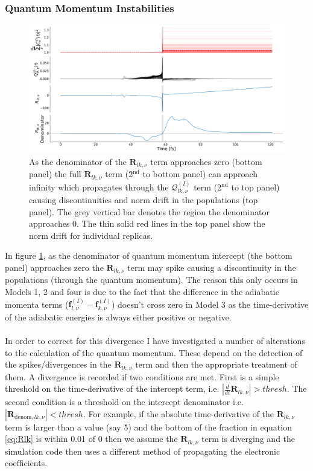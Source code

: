 \subsubsection{Quantum Momentum Instabilities}
\label{sect:QlkSpikes}
\begin{figure}[ht]
	\includegraphics[width=\textwidth]{../img/CTMQC/TullyModels/Spikes/RlkDenom_Rlk_Qlk_Norm.png}
	\caption{\label{fig:QlkSpike}As the denominator of the $\mathbf{R}_{lk,\nu}$ term approaches zero (bottom panel) the full $\mathbf{R}_{lk, \nu}$ term (2$^{\text{nd}}$ to bottom panel) can approach infinity which propagates through the $\mathcal{Q}_{lk, \nu}^{(I)}$ term (2$^{\text{nd}}$ to top panel) causing discontinuities and norm drift in the populations (top panel). The grey vertical bar denotes the region the denominator approaches 0. The thin solid red lines in the top panel show the norm drift for individual replicas.}
\end{figure}
\noindent In figure \ref{fig:QlkSpike}, as the denominator of quantum momentum intercept (the bottom panel) approaches zero the $\mathbf{R}_{lk, \nu}$ term may spike causing a discontinuity in the populations (through the quantum momentum). The reason this only occurs in Models 1, 2 and four is due to the fact that the difference in the adiabatic momenta terms ($\mathbf{f}_{l, \nu}^{(I)} - \mathbf{f}_{k, \nu}^{(I)}$) doesn't cross zero in Model 3 as the time-derivative of the adiabatic energies is always either positive or negative.
\\\\
In order to correct for this divergence I have investigated a number of alterations to the calculation of the quantum momentum. These depend on the detection of the spikes/divergences in the $\mathbf{R}_{lk, \nu}$ term and then the appropriate treatment of them. A divergence is recorded if two conditions are met. First is a simple threshold on the time-derivative of the intercept term, i.e. $|\frac{d}{dt} \mathbf{R}_{lk, \nu}| > thresh$. The second condition is a threshold on the intercept denominator i.e. $|\mathbf{R}_{\text{denom}, lk, \nu}| < thresh$. For example, if the absolute time-derivative of the $\mathbf{R}_{lk, \nu}$ term is larger than a value (say 5) and the bottom of the fraction in equation \eqref{eq:Rlk} is within 0.01 of 0 then we assume the $\mathbf{R}_{lk, \nu}$ term is diverging and the simulation code then uses a different method of propagating the electronic coefficients.
